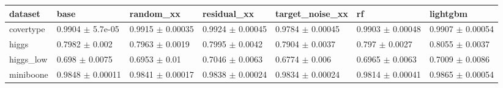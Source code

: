 \begin{tabular}{lllllll}
\toprule
dataset & base & random\_xx & residual\_xx & target\_noise\_xx & rf & lightgbm \\
\midrule
covertype & 0.9904 $\pm$ 5.7e-05 & 0.9915 $\pm$ 0.00035 & 0.9924 $\pm$ 0.00045 & 0.9784 $\pm$ 0.00045 & 0.9903 $\pm$ 0.00048 & 0.9907 $\pm$ 0.00054 \\
higgs & 0.7982 $\pm$ 0.002 & 0.7963 $\pm$ 0.0019 & 0.7995 $\pm$ 0.0042 & 0.7904 $\pm$ 0.0037 & 0.797 $\pm$ 0.0027 & 0.8055 $\pm$ 0.0037 \\
higgs\_low & 0.698 $\pm$ 0.0075 & 0.6953 $\pm$ 0.01 & 0.7046 $\pm$ 0.0063 & 0.6774 $\pm$ 0.006 & 0.6965 $\pm$ 0.0063 & 0.7009 $\pm$ 0.0086 \\
miniboone & 0.9848 $\pm$ 0.00011 & 0.9841 $\pm$ 0.00017 & 0.9838 $\pm$ 0.00024 & 0.9834 $\pm$ 0.00024 & 0.9814 $\pm$ 0.00041 & 0.9865 $\pm$ 0.00054 \\
\bottomrule
\end{tabular}
